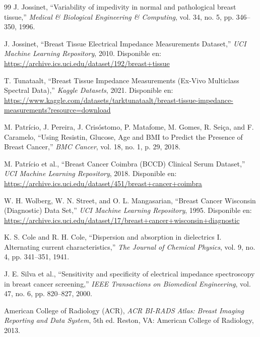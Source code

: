 \documentclass[11pt,a4paper]{article}
\begin{document}
\begin{thebibliography}{99}
J. Jossinet, ``Variability of impedivity in normal and pathological breast tissue,'' \textit{Medical \& Biological Engineering \& Computing}, vol. 34, no. 5, pp. 346--350, 1996.

J. Jossinet, ``Breast Tissue Electrical Impedance Measurements Dataset,'' \textit{UCI Machine Learning Repository}, 2010. Disponible en: \url{https://archive.ics.uci.edu/dataset/192/breast+tissue}

T. Tunataalt, ``Breast Tissue Impedance Measurements (Ex-Vivo Multiclass Spectral Data),'' \textit{Kaggle Datasets}, 2021. Disponible en: \url{https://www.kaggle.com/datasets/tarktunataalt/breast-tissue-impedance-measurements?resource=download}

M. Patrício, J. Pereira, J. Crisóstomo, P. Matafome, M. Gomes, R. Seiça, and F. Caramelo, ``Using Resistin, Glucose, Age and BMI to Predict the Presence of Breast Cancer,'' \textit{BMC Cancer}, vol. 18, no. 1, p. 29, 2018.

M. Patrício et al., ``Breast Cancer Coimbra (BCCD) Clinical Serum Dataset,'' \textit{UCI Machine Learning Repository}, 2018. Disponible en: \url{https://archive.ics.uci.edu/dataset/451/breast+cancer+coimbra}

W. H. Wolberg, W. N. Street, and O. L. Mangasarian, ``Breast Cancer Wisconsin (Diagnostic) Data Set,'' \textit{UCI Machine Learning Repository}, 1995. Disponible en: \url{https://archive.ics.uci.edu/dataset/17/breast+cancer+wisconsin+diagnostic}

K. S. Cole and R. H. Cole, ``Dispersion and absorption in dielectrics I. Alternating current characteristics,'' \textit{The Journal of Chemical Physics}, vol. 9, no. 4, pp. 341--351, 1941.

J. E. Silva et al., ``Sensitivity and specificity of electrical impedance spectroscopy in breast cancer screening,'' \textit{IEEE Transactions on Biomedical Engineering}, vol. 47, no. 6, pp. 820--827, 2000.

American College of Radiology (ACR), \textit{ACR BI-RADS Atlas: Breast Imaging Reporting and Data System}, 5th ed. Reston, VA: American College of Radiology, 2013.


\end{thebibliography}
\end{document}
